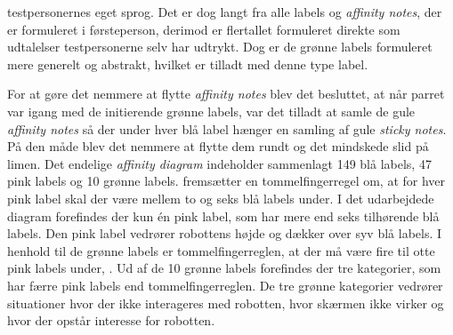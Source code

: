 testpersonernes eget sprog. Det er dog langt fra alle labels og \textit{affinity notes}, der er formuleret i førsteperson, derimod er flertallet formuleret direkte som udtalelser testpersonerne selv har udtrykt. Dog er de grønne labels formuleret mere generelt og abstrakt, hvilket er tilladt med denne type label.  

For at gøre det nemmere at flytte \textit{affinity notes} blev det besluttet, at når parret var igang med de initierende grønne labels, var det tilladt at samle de gule \textit{affinity notes} så der under hver blå label hænger en samling af gule \textit{sticky notes}. På den måde blev det nemmere at flytte dem rundt og det mindskede slid på limen. Det endelige \textit{affinity diagram} indeholder sammenlagt 149 blå labels, 47 pink labels og 10 grønne labels. \textcite[s. 174]{Book:BuildingAnAffinity} fremsætter en tommelfingerregel om, at for hver pink label skal der være mellem to og seks blå labels under. I det udarbejdede diagram forefindes der kun én pink label, som har mere end seks tilhørende blå labels. Den pink label vedrører robottens højde og dækker over syv blå labels. I henhold til de grønne labels er tommelfingerreglen, at der må være fire til otte pink labels under, \parencite[s. 174]{Book:BuildingAnAffinity}. Ud af de 10 grønne labels forefindes der tre kategorier, som har færre pink labels end tommelfingerreglen. De tre grønne kategorier vedrører situationer hvor der ikke interageres med robotten, hvor skærmen ikke virker og hvor der opstår interesse for robotten. 
\newpage 
